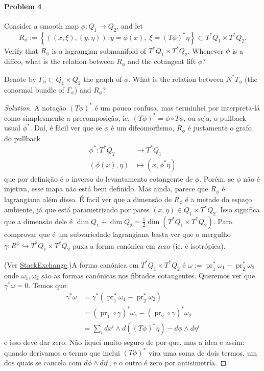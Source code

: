 \paragraph{Problem 4} Consider a smooth map $\phi:Q_1\to Q_2$, and let
\[R_{\phi}:=\left\{ \left( (x,\xi),(y,\eta) \right) :y=\phi(x),\;\xi=(T\phi)^*\eta \right\} \subset T^*Q_1\times T^*Q_2.\]
Verify that $R_\phi$ is a lagrangian submanifold of $T^* Q_1\times \overline{T^*Q_2}$. Whenever $\phi$ is a diffeo, what is the relation between $R_\phi$ and the cotangent lift $\hat{\phi}$?

Denote by $\Gamma_\phi\subset Q_1\times Q_2$ the graph of $\phi$. What is the relation between $N^*T_\phi$ (the conormal bundle of $\Gamma_\phi$) and  $R_\phi$?

\begin{proof}[Solution]\leavevmode
	A nota\c c\~ao $(T\phi)^*$ \'e um pouco confusa, mas terminhei por interpreta-l\'a como simplesmente a precomposi\c c\~ao, ie. $(T\phi)^*=\phi\circ T\phi$, ou seja, o pullback usual $\phi^*$. Da\'i, \'e f\'acil ver que se $\phi$ \'e um difeomorfismo, $R_\phi$ \'e justamente o grafo do pullback
	\begin{align*}
		\phi^*: T^*Q_2 &\longrightarrow T^*Q_1 \\
		(\phi(x),\eta ) &\longmapsto (x,\phi^*\eta )
	\end{align*}
que por defini\c c\~ao \'e o inverso do levantamento cotangente de $\phi$. Por\'em, se $\phi $ n\~ao \'e injetiva, esse mapa n\~ao est\'a bem definido. Mas ainda, parece que $R_\phi$ \'e lagrangiana al\'em disso. \'E facil ver que a dimens\~ao de $R_\phi$ \'e a metade do espaço ambiente, j\'a que est\'a parametrizado por pares $(x,\eta)\in Q_1\times T^*Q_2$. Isso significa que a dimens\~ao dele \'e $\dim Q_1+\dim Q_2=\frac{1}{2}\dim (T^*Q_1\times T^*Q_2)$. Para comprovar que \'e um subvariedade lagrangiana basta ver que o mergulho $\gamma:R^{\phi} \hookrightarrow T^*Q_1\times \overline{T^*Q_2}$ puxa a forma can\'onica em zero (ie. \'e isotr\'opica).

(Ver \href{https://math.stackexchange.com/questions/2859956/conormal-bundle-and-lagrangian-submanifold}{StackExchange}.)A forma can\'onica em $T^*Q_1\times \overline{T^*Q_2}$ \'e $ \omega:=\operatorname{pr}_1^*\omega_1-\operatorname{pr}_2^*\omega_2$ onde $ \omega_1,\omega_2$ s\~ao as formas can\'onicas nos fibrados cotangentes. Queremos ver que $\gamma^*\omega=0$.
Temos que:
\begin{align*}
	 \gamma^*\omega&= \gamma^* (\operatorname{pr}_1^*\omega_1-\operatorname{pr}_2^*\omega_2)\\
	 &=(\operatorname{pr}_1\circ \gamma)^*\omega_1-(\operatorname{pr}_2\circ  \gamma)^*\omega_2\\
	 &=\sum_{i}dx^i\wedge d((T\phi )^*\eta )-d\phi \wedge d\eta^i
\end{align*}
e isso deve dar zero. Não fiquei muito seguro de por que, mas a idea e assim: quando derivamos o termo que inclui $(T\phi)^*$ vira uma soma de dois termos, um dos quais se cancela com  $d\phi \wedge d\eta^i$, e o outro \'e zero por antisimetr\'ia.


\end{proof}
